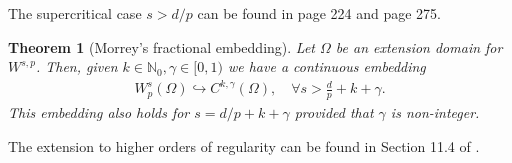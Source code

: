 \documentclass[
    a4paper,
    DIV=14,
    abstract=true,
    numbers=noenddot
]
{scrartcl}
\newtheorem{theorem}{Theorem}[section]
\theoremstyle{definition}
\newcommand{\N}{\mathbb{N}}
\begin{document}
The supercritical case $s>d/p$ can be found in \cite{agranovich2015sobolev} page 224 and \cite{leoni2023first} page 275.
\begin{theorem}[Morrey's fractional embedding]\label{morrey embedding}
    Let $\Omega $ be an extension domain for $W^{s,p}$. Then, given $k \in \N_0, \gamma \in [0,1)$  we have a continuous embedding
    \begin{align*}
        W_p^s(\Omega) \hookrightarrow  C^{k,\gamma}(\Omega), \quad\forall s> \frac{d}{p} + k+\gamma.
    \end{align*}
    This embedding also holds for $s=d / p+k+\gamma$ provided that $\gamma $ is non-integer.
\end{theorem}
The extension to higher orders of regularity can be found in Section 11.4 of \cite{leoni2023first}.







\end{document}
